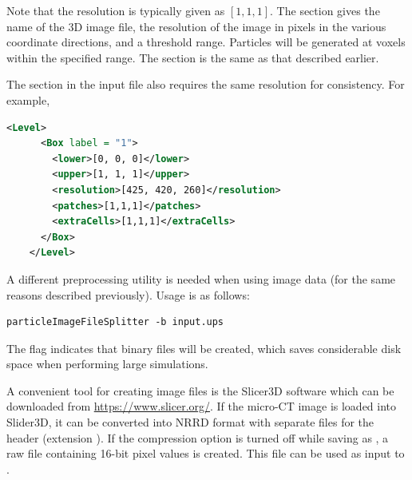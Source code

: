  Note that the  resolution is typically given as $[1,1,1]$. 
  The  section gives the name of the 3D image file, 
  the resolution of the image in pixels in the various coordinate directions, and 
  a threshold range.  Particles will be generated at voxels within the specified range.  
  The  section is the same as that described earlier.  

  The  section in the input file also requires the same resolution for
  consistency.  For example, 
  \begin{lstlisting}[language=XML]
    <Level>
      <Box label = "1">
        <lower>[0, 0, 0]</lower>
        <upper>[1, 1, 1]</upper>
        <resolution>[425, 420, 260]</resolution>
        <patches>[1,1,1]</patches>
        <extraCells>[1,1,1]</extraCells>
      </Box>
    </Level>
  \end{lstlisting}

  A different preprocessing utility is needed when using image data (for the same reasons 
  described previously).  Usage is as follows:
  \begin{lstlisting}[backgroundcolor=\color{background}]
     particleImageFileSplitter -b input.ups
  \end{lstlisting}
  The  flag indicates that binary  files will be created, which
  saves considerable disk space when performing large simulations.

  \begin{NoteBox}
   A convenient tool for creating  image files is the Slicer3D software
   which can be downloaded from \url{https://www.slicer.org/}.  If the micro-CT image
   is loaded into Slider3D, it can be converted into NRRD format with separate files
   for the header (extension ).  If the compression option is turned off
   while saving as , a raw file containing 16-bit pixel values is created.
   This file can be used as input to \Vaango.
  \end{NoteBox}

